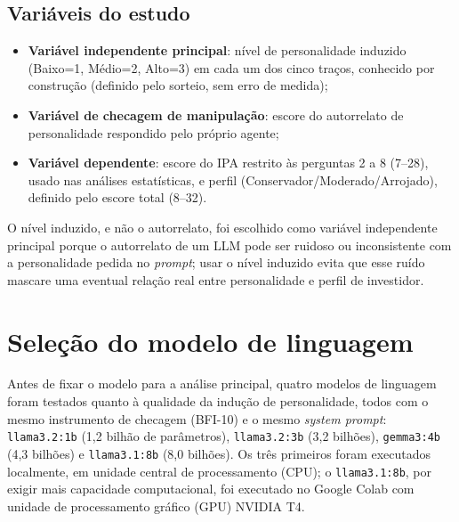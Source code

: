 \subsection{Variáveis do estudo}

\begin{itemize}
    \item \textbf{Variável independente principal}: nível de personalidade
    induzido (Baixo=1, Médio=2, Alto=3) em cada um dos cinco traços,
    conhecido por construção (definido pelo sorteio, sem erro de medida);
    \item \textbf{Variável de checagem de manipulação}: escore do
    autorrelato de personalidade respondido pelo próprio agente;
    \item \textbf{Variável dependente}: escore do IPA restrito às perguntas
    2 a 8 (7--28), usado nas análises estatísticas, e perfil
    (Conservador/\allowbreak Moderado/\allowbreak Arrojado), definido pelo
    escore total (8--32).
\end{itemize}

O nível induzido, e não o autorrelato, foi escolhido como variável
independente principal porque o autorrelato de um LLM pode ser ruidoso ou
inconsistente com a personalidade pedida no \textit{prompt}; usar o nível
induzido evita que esse ruído mascare uma eventual relação real entre
personalidade e perfil de investidor.

\section{Seleção do modelo de linguagem}
\label{sec:selecao-modelo}

Antes de fixar o modelo para a análise principal, quatro modelos de
linguagem foram testados quanto à qualidade da indução de personalidade,
todos com o mesmo instrumento de checagem (BFI-10) e o mesmo
\textit{system prompt}: \texttt{llama3.2:1b} (1,2 bilhão de parâmetros),
\texttt{llama3.2:3b} (3,2 bilhões), \texttt{gemma3:4b} (4,3 bilhões) e
\texttt{llama3.1:8b} (8,0 bilhões). Os três primeiros foram executados
localmente, em unidade central de processamento (CPU); o
\texttt{llama3.1:8b}, por exigir mais capacidade computacional, foi
executado no Google Colab com unidade de processamento gráfico (GPU)
NVIDIA T4.

